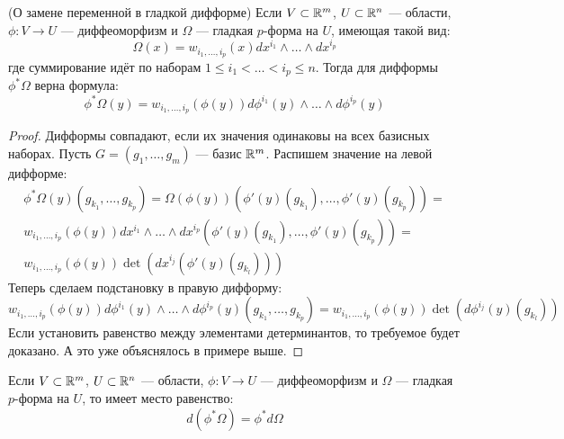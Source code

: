 \begin{theorem} (О замене переменной в гладкой дифформе)
	Если $V \subset \mathbb{R}^m$, $U \subset \mathbb{R}^n$ --- области, $\phi \colon V \to U$ --- диффеоморфизм и $\Omega$ --- гладкая $p$-форма на $U$, имеющая такой вид:
	\[
		\Omega(x) = w_{i_1, \ldots, i_p}(x) dx^{i_1} \wedge \ldots \wedge dx^{i_p}
	\]
	где суммирование идёт по наборам $1 \le i_1 < \ldots < i_p \le n$. Тогда для дифформы $\phi^*\Omega$ верна формула:
	\[
		\phi^*\Omega(y) = w_{i_1, \ldots, i_p}(\phi(y))d\phi^{i_1}(y) \wedge \ldots \wedge d\phi^{i_p}(y)
	\]
\end{theorem}

\begin{proof}
	Дифформы совпадают, если их значения одинаковы на всех базисных наборах. Пусть $G = (g_1, \ldots, g_m)$ --- базис $\mathbb{R}^m$. Распишем значение на левой дифформе:
	\begin{multline*}
		\phi^*\Omega(y)(g_{k_1}, \ldots, g_{k_p}) = \Omega(\phi(y))(\phi'(y)(g_{k_1}), \ldots, \phi'(y)(g_{k_p})) =
		\\
		w_{i_1, \ldots, i_p}(\phi(y)) dx^{i_1} \wedge \ldots \wedge dx^{i_p}(\phi'(y)(g_{k_1}), \ldots, \phi'(y)(g_{k_p})) =
		\\
		w_{i_1, \ldots, i_p}(\phi(y)) \det(dx^{i_j}(\phi'(y)(g_{k_l})))
	\end{multline*}
	Теперь сделаем подстановку в правую дифформу:
	\[
		w_{i_1, \ldots, i_p}(\phi(y))d\phi^{i_1}(y) \wedge \ldots \wedge d\phi^{i_p}(y)(g_{k_1}, \ldots, g_{k_p}) = w_{i_1, \ldots, i_p}(\phi(y)) \det(d\phi^{i_j}(y)(g_{k_l}))
	\]
	Если установить равенство между элементами детерминантов, то требуемое будет доказано. А это уже объяснялось в примере выше.
\end{proof}

\begin{corollary}
	Если $V \subset \mathbb{R}^m$, $U \subset \mathbb{R}^n$ --- области, $\phi \colon V \to U$ --- диффеоморфизм и $\Omega$ --- гладкая $p$-форма на $U$, то имеет место равенство:
	\[
		d(\phi^*\Omega) = \phi^*d\Omega
	\]
\end{corollary}


